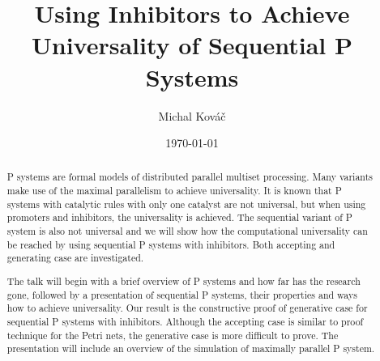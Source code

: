 \documentclass[llncs,submission,copyright,creativecommons]{../lib/lncs/llncs}
\begin{document}
\title{Using Inhibitors to Achieve Universality of Sequential P Systems}
\author{Michal Kováč}
\date{\today}
\maketitle

\begin{abstract}
P systems are formal models of distributed parallel multiset processing. Many variants make use of the maximal parallelism to achieve universality.
It is known that P systems with catalytic rules with only one catalyst are not universal, but when using promoters and inhibitors, the universality is achieved.
The sequential variant of P system is also not universal and we will show how the computational universality can be reached by using sequential P systems with inhibitors. Both accepting and generating case are investigated.

The talk will begin with a brief overview of P systems and how far has the research gone, followed by a presentation of sequential P systems, their properties and ways how to achieve universality. Our result is the constructive proof of generative case for sequential P systems with inhibitors. Although the accepting case is similar to proof technique for the Petri nets, the generative case is more difficult to prove. The presentation will include an overview of the simulation of maximally parallel P system.
\end{abstract}
\end{document}
